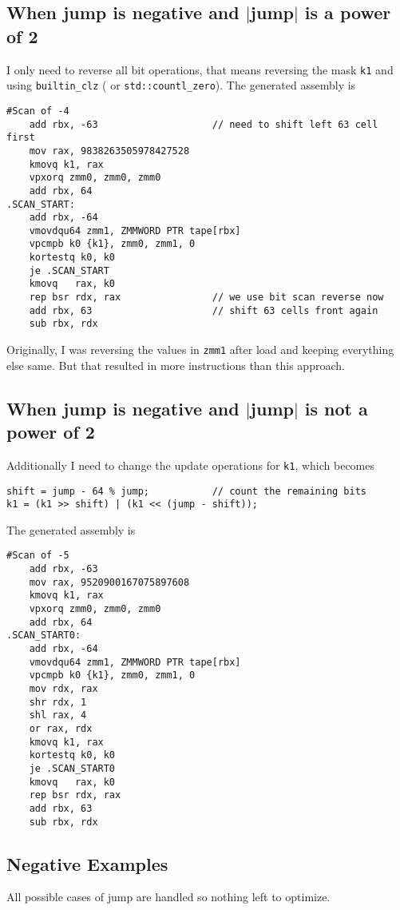 \documentclass[11pt,answers]{exam}
\begin{document}
\subsection{When jump is negative and $\mid$jump$\mid$ is a power of 2}
I only need to reverse all bit operations, that means reversing the mask \texttt{k1} and using \texttt{builtin\_clz} ( or \texttt{std::countl\_zero}). The generated assembly is
	{\renewcommand\fcolorbox[4][]{\textcolor{cyan}{\strut#4}}
		\begin{verbatim}
#Scan of -4
	add rbx, -63                    // need to shift left 63 cell first
	mov rax, 9838263505978427528
	kmovq k1, rax
	vpxorq zmm0, zmm0, zmm0
	add rbx, 64
.SCAN_START:
	add rbx, -64
	vmovdqu64 zmm1, ZMMWORD PTR tape[rbx]
	vpcmpb k0 {k1}, zmm0, zmm1, 0
	kortestq k0, k0
	je .SCAN_START
	kmovq   rax, k0
	rep bsr rdx, rax                // we use bit scan reverse now
	add rbx, 63                     // shift 63 cells front again
	sub rbx, rdx
\end{verbatim}
	}

Originally, I was reversing the values in \texttt{zmm1} after load and keeping everything else same. But that resulted in more instructions than this approach.

\pagebreak
\subsection{When jump is negative and $\mid$jump$\mid$ is not a power of 2}
Additionally I need to change the update operations for \texttt{k1}, which becomes
\begin{verbatim}
shift = jump - 64 % jump;           // count the remaining bits
k1 = (k1 >> shift) | (k1 << (jump - shift));
\end{verbatim}
The generated assembly is
	{\renewcommand\fcolorbox[4][]{\textcolor{cyan}{\strut#4}}
		\begin{verbatim}
#Scan of -5
	add rbx, -63
	mov rax, 9520900167075897608
	kmovq k1, rax
	vpxorq zmm0, zmm0, zmm0
	add rbx, 64
.SCAN_START0:
	add rbx, -64
	vmovdqu64 zmm1, ZMMWORD PTR tape[rbx]
	vpcmpb k0 {k1}, zmm0, zmm1, 0
	mov rdx, rax
	shr rdx, 1
	shl rax, 4
	or rax, rdx
	kmovq k1, rax
	kortestq k0, k0
	je .SCAN_START0
	kmovq   rax, k0
	rep bsr rdx, rax
	add rbx, 63
	sub rbx, rdx
\end{verbatim}
	}

\subsection{Negative Examples}
All possible cases of jump are handled so nothing left to optimize.
\end{document}
